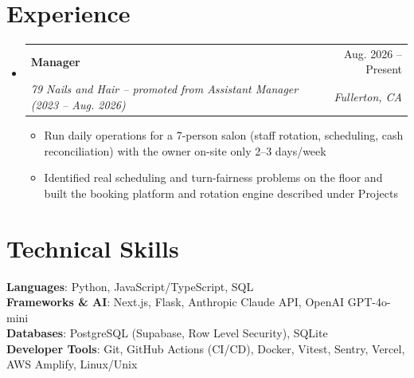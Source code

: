 \documentclass[letterpaper,11pt]{article}
\makeatletter
\newcommand{\resumeItem}[1]{
  \item\small{
    {#1 \vspace{-2pt}}
  }
}
\newcommand{\resumeSubheading}[4]{
  \vspace{-2pt}\item
    \begin{tabular*}{0.97\textwidth}[t]{l@{\extracolsep{\fill}}r}
      \textbf{#1} & #2 \\
      \textit{\small#3} & \textit{\small #4} \\
    \end{tabular*}\vspace{-7pt}
}
\newcommand{\resumeSubHeadingListStart}{\begin{itemize}[leftmargin=0.15in, label={}]}
\newcommand{\resumeSubHeadingListEnd}{\end{itemize}}
\newcommand{\resumeItemListStart}{\begin{itemize}}
\newcommand{\resumeItemListEnd}{\end{itemize}\vspace{-5pt}}
\makeatother
\begin{document}
\section{Experience}
  \resumeSubHeadingListStart

    \resumeSubheading
      {Manager}{Aug. 2026 -- Present}
      {79 Nails and Hair -- promoted from Assistant Manager (2023 -- Aug. 2026)}{Fullerton, CA}
      \resumeItemListStart
        \resumeItem{Run daily operations for a 7-person salon (staff rotation, scheduling, cash reconciliation) with the owner on-site only 2--3 days/week}
        \resumeItem{Identified real scheduling and turn-fairness problems on the floor and built the booking platform and rotation engine described under Projects}
      \resumeItemListEnd

  \resumeSubHeadingListEnd


\section{Technical Skills}
 \begin{itemize}[leftmargin=0.15in, label={}]
    \small{\item{
     \textbf{Languages}{: Python, JavaScript/TypeScript, SQL} \\
     \textbf{Frameworks \& AI}{: Next.js, Flask, Anthropic Claude API, OpenAI GPT-4o-mini} \\
     \textbf{Databases}{: PostgreSQL (Supabase, Row Level Security), SQLite} \\
     \textbf{Developer Tools}{: Git, GitHub Actions (CI/CD), Docker, Vitest, Sentry, Vercel, AWS Amplify, Linux/Unix}
    }}
 \end{itemize}


\end{document}
